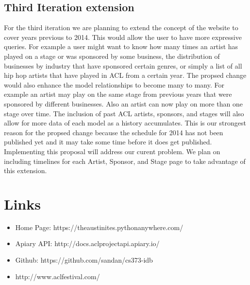 \documentclass[12pt,english]{scrartcl}
\begin{document}
\subsection{Third Iteration extension}
For the third iteration we are planning to extend the concept of the website to cover years previous to 2014. This would allow 
the user to have more  expressive queries. For example a user might want to know  how many times an artist has played on a stage
or was sponsored by some business, the distribution of businesses by industry that have sponsored certain genres, or simply a 
list of all hip hop artists that have played in ACL from a certain year.
 The propsed change would also enhance the model relationships to become many to many. For example an artist may play on the same stage
 from previous years that were sponsored by different businesses. Also an artist can now play on more than one stage over time. The 
 inclusion of past ACL artists, sponsors, and stages will also allow for more data of each model as a history accumulates. This is our strongest
 reason for the propsed change because the schedule for 2014 has not been published yet and it may take some time before it does get published. Implementing this
 proposal will address our curent problem. We plan on including timelines for each Artist, Sponsor, and Stage page to take advantage of this extension.
 
\section{Links}

\begin{itemize}
 \item Home Page: https://theaustinites.pythonanywhere.com/
 \item Apiary API: http://docs.aclprojectapi.apiary.io/
 \item Github: https://github.com/sandan/cs373-idb
 \item http://www.aclfestival.com/
\end{itemize}
\end{document}
